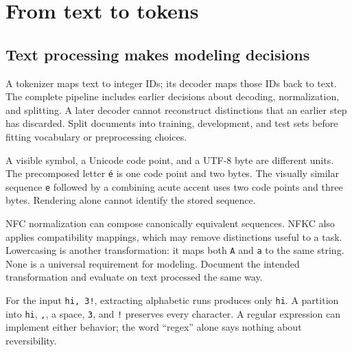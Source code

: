 \clearpage
\section{From text to tokens}\label{sec:tokens}
\subsection*{Text processing makes modeling decisions}
A tokenizer maps text to integer IDs; its decoder maps those IDs back to
text. The complete pipeline includes earlier decisions about decoding,
normalization, and splitting. A later decoder cannot reconstruct distinctions
that an earlier step has discarded. Split documents into training,
development, and test sets before fitting vocabulary or preprocessing choices.


A visible symbol, a Unicode code point, and a UTF-8 byte are different
units. The precomposed letter \texttt{\'e} is one code point and two bytes.
The visually similar sequence \texttt{e} followed by a combining acute accent
uses two code points and three bytes. Rendering alone cannot identify the
stored sequence.


NFC normalization can compose canonically equivalent sequences. NFKC also
applies compatibility mappings, which may remove distinctions useful to a
task. Lowercasing is another transformation: it maps both \texttt{A} and
\texttt{a} to the same string. None is a universal requirement for modeling.
Document the intended transformation and evaluate on text processed the same way.


For the input \texttt{hi, 3!}, extracting alphabetic runs produces only
\texttt{hi}. A partition into \texttt{hi}, \texttt{,}, a space, \texttt{3},
and \texttt{!} preserves every character. A regular expression can implement
either behavior; the word ``regex'' alone says nothing about reversibility.


